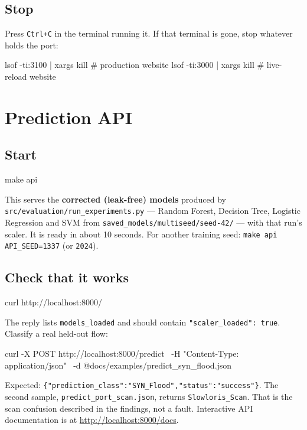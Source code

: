 \documentclass[11pt, a4paper]{article}
\newcommand{\fpath}[1]{\texttt{\small #1}}
\begin{document}
\subsection{Stop}

Press \texttt{Ctrl+C} in the terminal running it. If that terminal is gone, stop
whatever holds the port:

\begin{cmd}
lsof -ti:3100 | xargs kill      # production website
lsof -ti:3000 | xargs kill      # live-reload website
\end{cmd}

\section{Prediction API}

\subsection{Start}

\begin{cmd}
make api
\end{cmd}

This serves the \textbf{corrected (leak-free) models} produced by
\fpath{src/evaluation/run\_experiments.py} --- Random Forest, Decision Tree,
Logistic Regression and SVM from \fpath{saved\_models/multiseed/seed-42/} --- with
that run's scaler. It is ready in about 10 seconds. For another training seed:
\texttt{make api API\_SEED=1337} (or \texttt{2024}).

\subsection{Check that it works}

\begin{cmd}
curl http://localhost:8000/
\end{cmd}

The reply lists \texttt{models\_loaded} and should contain
\texttt{"scaler\_loaded": true}. Classify a real held-out flow:

\begin{cmd}
curl -X POST http://localhost:8000/predict \
     -H "Content-Type: application/json" \
     -d @docs/examples/predict_syn_flood.json
\end{cmd}

Expected: \texttt{\{"prediction\_class":"SYN\_Flood","status":"success"\}}. The
second sample, \fpath{predict\_port\_scan.json}, returns \texttt{Slowloris\_Scan}.
That is the scan confusion described in the findings, not a fault. Interactive
API documentation is at \url{http://localhost:8000/docs}.
\end{document}
